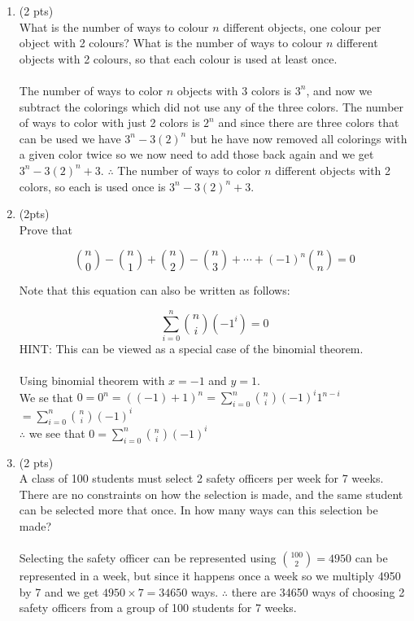 \documentclass[12pt]{article}
\begin{document}
\begin{enumerate}
\item (2 pts) \\ What is the number of ways to colour $n$ different objects, one colour per object with 2 colours? What is the number of ways to colour $n$ different objects with 2 colours, so that each colour is used at least once.\\
    \\The number of ways to color $n$ objects with 3 colors is $3^n$, and now we subtract the colorings which did not use any of the three colors. The number of ways to color with just 2 colors is $2^n$ and since there are three colors that can be used we have $3^n - 3(2)^n$ but he have now removed all colorings with a given color twice so we now need to add those back again and we get $3^n - 3(2)^n + 3$. $\therefore$ The number of ways to color $n$ different objects with 2 colors, so each is used once is $3^n - 3(2)^n + 3$.

\item (2pts)\\
Prove that

$$
{n \choose 0} - { n \choose 1} + {n \choose 2} - {n \choose 3} + \cdots  + (-1)^n{n \choose n} = 0
$$

Note that this equation can also be written as follows:

$$
\sum_{i=0}^n {n \choose i}(-1^{i}) = 0
$$
HINT: This can be viewed as a special case of the binomial theorem.\\
\\Using binomial theorem with $x=-1$ and $y=1$.
\\We se that $0=0^n=((-1)+1)^n = \sum_{i=0}^{n} \binom{n}{i}(-1)^{i}1^{n-i}$
\\$=\sum_{i=0}^{n} \binom{n}{i}(-1)^i$
\\$\therefore$ we see that $0=\sum_{i=0}^{n} \binom{n}{i}(-1)^i$




\item (2 pts)\\
 A class of 100 students must select  2 safety officers per week for 7 weeks. There are no constraints on how the selection is made, and the same student can be selected more that once. In how many ways can this selection be made?\\
 \\Selecting the safety officer can be represented using $\binom{100}{2} = 4950$ can be represented in a week, but since it happens once a week so we multiply 4950 by 7 and we get $4950 \times 7 = 34650$ ways. $\therefore$ there are 34650 ways of choosing 2 safety officers from a group of 100 students for 7 weeks.

\
\end{enumerate}


\vfill
\end{document}
